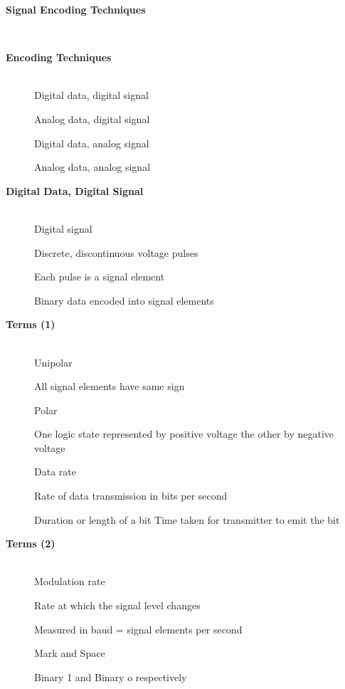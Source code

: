 \begin{description}
\os{\newpage}\item[{\rot\bf  Signal Encoding Techniques }]~\\[-3ex]


\os{\newpage}\item[{\rot\bf  Encoding Techniques }]~\\[-3ex]

\bi
  \ite Digital data, digital signal

  \ite Analog data, digital signal

  \ite Digital data, analog signal

  \ite Analog data, analog signal

\ei


\os{\newpage}\item[{\rot\bf  Digital Data, Digital Signal }]~\\[-3ex]

\bi
  \ite Digital signal

  \ite Discrete, discontinuous voltage pulses

\ei
\bi
 \ite Each pulse is a signal element
 \ei


\bi
  \ite Binary data encoded into signal elements
\ei


\os{\newpage}\item[{\rot\bf  Terms (1) }]~\\[-3ex]

\bi
  \ite Unipolar
\ei

All signal elements have same sign

\bi
  \ite Polar

  \ite One logic state represented by positive voltage the other by negative voltage

  \ite Data rate

\ei
\bi
 \ite Rate of data transmission in bits per second
 \ei


\bi
  \ite Duration or length of a bit
\ei
\bi
 \ite Time taken for transmitter to emit the bit
 \ei



\os{\newpage}\item[{\rot\bf  Terms (2) }]~\\[-3ex]

\bi
  \ite Modulation rate

  \ite Rate at which the signal level changes

  \ite Measured in baud = signal elements per second

  \ite Mark and Space

\ei
\bi
 \ite Binary 1 and Binary o respectively
 \ei




\end{description}
